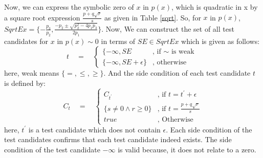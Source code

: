 Now, we can express the symbolic zero of $x$ in $p(x)$, which is quadratic in x by a square root expression $\frac{p+q\sqrt{r}}{s}$ as given in Table \ref{sqrt}.\newline
So, for $x$ in $p(x)$, $SqrtEx=\{-\frac{p_{3}}{p_{2}}, \frac{-p_{2}\pm \sqrt{p_{2}^{2}-4p_{1}p_{3}}}{2p_{1}}\}$. Now, We can construct the set of all test candidates for $x$ in $p(x)\sim 0$ in terms of $SE\in SqrtEx$ which is given as follows:
		$$
		t
\quad = \quad 
\left\{
\begin{array}{ll}
{\displaystyle \{-\infty,SE} 
& 
\text{, if }\sim \text{ is weak }
\\[0.6cm] %
{\displaystyle \{-\infty,SE+\epsilon\}}
& 
\text{, otherwise }
\end{array}
\right.$$
here, weak means $\{=,\leq,\geq\}$.\newline
And the side condition of each test candidate $t$ is defined by:
		$$
C_t
\quad = \quad 
\left\{
\begin{array}{lll}
{\displaystyle C_{t^{\prime}}}
& 
\text{, if } t = t^{\prime} + \epsilon
\\[0.6cm] %
{\displaystyle \{s\neq 0 \wedge r\geq 0\}}
& 
\text{, if } t = \frac{p+q\sqrt{r}}{s}
\\[0.6cm] %
{\displaystyle true}
& 
\text{, Otherwise }
\end{array}
\right.$$
here, $t^{\prime}$ is a test candidate which does not contain $\epsilon$.\newline
Each side condition of the test candidates confirms that each test candidate indeed exists. The side condition of the test candidate $-\infty$ is valid because, it does not relate to a zero.
